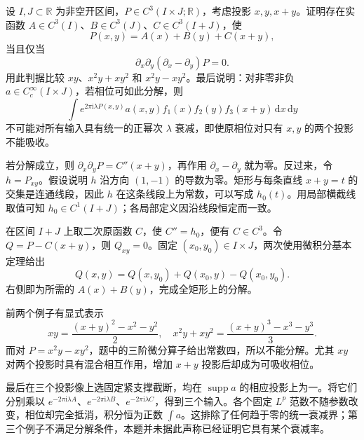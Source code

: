 \begin{optionalexercise}\label{b2:ex:25-new-1}
设 \(I,J\subset\mathbb R\) 为非空开区间，\(P\in C^3(I\times J;\mathbb R)\)，考虑投影 \(x,y,x+y\)。证明存在实函数
\(A\in C^3(I)\)、\(B\in C^3(J)\)、\(C\in C^3(I+J)\)，使
\[
 P(x,y)=A(x)+B(y)+C(x+y),
\]
当且仅当
\[
 \partial_x\partial_y(\partial_x-\partial_y)P=0.
\]
用此判据比较 \(xy\)、\(x^2y+xy^2\) 和 \(x^2y-xy^2\)。最后说明：对非零非负 \(a\in C_c^\infty(I\times J)\)，若相位可如此分解，则
\[
 \int e^{2\pi\mathrm i\lambda P(x,y)}a(x,y)
            f_1(x)f_2(y)f_3(x+y)\,\mathrm dx\,\mathrm dy
\]
不可能对所有输入具有统一的正幂次 \(\lambda\) 衰减，即使原相位对只有 \(x,y\) 的两个投影不能吸收。
\end{optionalexercise}
\begin{solution}
若分解成立，则 \(\partial_x\partial_yP=C''(x+y)\)，再作用 \(\partial_x-\partial_y\) 就为零。反过来，令 \(h=P_{xy}\)。假设说明 \(h\) 沿方向 \((1,-1)\) 的导数为零。矩形与每条直线 \(x+y=t\) 的交集是连通线段，因此 \(h\) 在这条线段上为常数，可以写成 \(h_0(t)\)。用局部横截线取值可知 \(h_0\in C^1(I+J)\)；各局部定义因沿线段恒定而一致。

在区间 \(I+J\) 上取二次原函数 \(C\)，使 \(C''=h_0\)，便有 \(C\in C^3\)。令 \(Q=P-C(x+y)\)，则 \(Q_{xy}=0\)。固定 \((x_0,y_0)\in I\times J\)，两次使用微积分基本定理给出
\[
 Q(x,y)=Q(x,y_0)+Q(x_0,y)-Q(x_0,y_0).
\]
右侧即为所需的 \(A(x)+B(y)\)，完成全矩形上的分解。

前两个例子有显式表示
\[
 xy=\frac{(x+y)^2-x^2-y^2}{2},
 \quad x^2y+xy^2=\frac{(x+y)^3-x^3-y^3}{3}.
\]
而对 \(P=x^2y-xy^2\)，题中的三阶微分算子给出常数四，所以不能分解。尤其 \(xy\) 对两个投影时具有混合相互作用，增加 \(x+y\) 投影后却成为可吸收相位。

最后在三个投影像上选固定紧支撑截断，均在 \(\operatorname{supp}a\) 的相应投影上为一。将它们分别乘以
\(e^{-2\pi\mathrm i\lambda A}\)、\(e^{-2\pi\mathrm i\lambda B}\)、\(e^{-2\pi\mathrm i\lambda C}\)，得到三个输入。各个固定 \(L^p\) 范数不随参数改变，相位却完全抵消，积分恒为正数 \(\int a\)。这排除了任何趋于零的统一衰减界；第三个例子不满足分解条件，本题并未据此声称已经证明它具有某个衰减率。
\end{solution}


